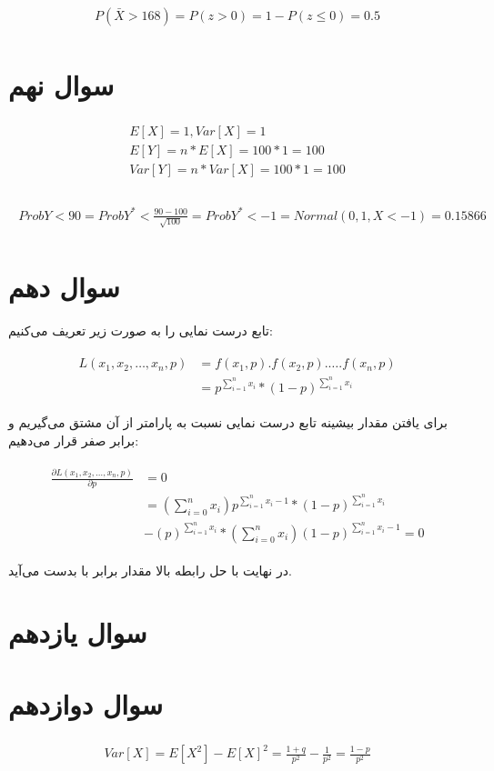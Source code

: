 \documentclass[paper=a4, fontsize=11pt]{article}
\numberwithin{equation}{section} %
\numberwithin{figure}{section} %
\numberwithin{table}{section} %
\begin{document}
\begin{align}
\begin{split}
    P(\bar{X} > 168) = P(z > 0) = 1 - P(z \le 0) = 0.5 
\end{split}
\end{align}

\section{سوال نهم}

\begin{align}
\begin{split}
    E[X] = 1, Var[X] = 1\\
    E[Y] = n * E[X] = 100 * 1 = 100\\
    Var[Y] = n * Var[X]  = 100 * 1 = 100\\
\end{split}
\end{align}

\begin{align}
\begin{split}
    Prob{Y < 90} = Prob{Y^* < \frac{90 - 100}{\sqrt{100}}} = Prob{Y^* < -1} = Normal(0, 1, X < -1) = 0.15866
\end{split}
\end{align}

\section{سوال دهم}
تابع درست نمایی را به صورت زیر تعریف می‌کنیم:

\begin{align}
\begin{split}
    L(x_1, x_2, \ldots, x_n, p) &= f(x_1, p) . f(x_2, p) . \ldots . f(x_n, p)\\
    &= p^{\sum_{i=1}^{n} x_i} * (1-p)^{\sum_{i=1}^{n} x_i}
\end{split}
\end{align}

برای یافتن مقدار بیشینه تابع درست نمایی نسبت به پارامتر 
از آن مشتق می‌گیریم و برابر صفر قرار می‌دهیم:

\begin{align}
\begin{split}
    \frac{\partial L(x_1, x_2, \ldots, x_n, p)}{\partial p} &= 0\\
    &= (\sum_{i=0}^{n} x_i) p^{\sum_{i=1}^{n} x_i - 1} * (1-p)^{\sum_{i=1}^{n} x_i}\\
    &- (p)^{\sum_{i=1}^{n} x_i} * (\sum_{i=0}^{n} x_i) (1-p)^{\sum_{i=1}^{n} x_i - 1} = 0
\end{split}
\end{align}

در نهایت با حل رابطه بالا مقدار  برابر با 
بدست می‌آید.

\section{سوال یازدهم}

\section{سوال دوازدهم}
\begin{align}
\begin{split}
    Var[X] = E[X^2] - E[X]^2 = \frac{1+q}{p^2} - \frac{1}{p^2} = \frac{1-p}{p^2}
\end{split}
\end{align}
\end{document}

